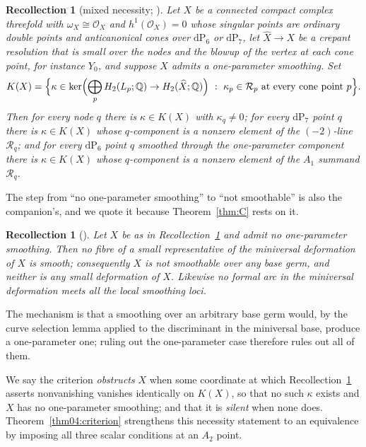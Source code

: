 \documentclass[11pt]{amsart}
\newtheorem{recollection}[theorem]{Recollection}
\theoremstyle{definition}
\theoremstyle{remark}
\theoremstyle{plain}
\newcommand{\QQ}{\mathbb{Q}}
\newcommand{\cO}{\mathcal{O}}
\newcommand{\Rsm}{\mathcal{R}}   %
\newcommand{\dP}{\mathrm{dP}}
\newcommand{\Xh}{\widehat{X}}
\begin{document}
\begin{recollection}[mixed necessity; {\cite[Thm.~6.1]{PaperIV}}]\label{thm:companion}
Let $X$ be a connected compact complex threefold with $\omega_X\cong\cO_X$ and
$h^1(\cO_X)=0$ whose singular points are ordinary double points and
anticanonical cones over $\dP_6$ or $\dP_7$, let $\Xh\to X$ be a crepant
resolution that is small over the nodes and the blowup of the vertex at each
cone point, for instance $Y_0$, and suppose $X$ admits a
one-parameter smoothing.  Set
\[
  K(X)=\Bigl\{\kappa\in\ker\Bigl(\bigoplus_pH_2(L_p;\QQ)\to H_2(\Xh;\QQ)\Bigr)
  \ :\ \kappa_p\in \Rsm_p\text{ at every cone point }p\Bigr\}.
\]
Then for every node $q$ there is $\kappa\in K(X)$ with $\kappa_q\neq0$; for
every $\dP_7$ point $q$ there is $\kappa\in K(X)$ whose $q$-component is a
nonzero element of the $(-2)$-line $\Rsm_q$; and for every $\dP_6$ point $q$
smoothed through the one-parameter component there is $\kappa\in K(X)$ whose
$q$-component is a nonzero element of the $A_1$ summand $\Rsm_q$.
\end{recollection}

The step from ``no one-parameter smoothing'' to ``not smoothable'' is also the
companion's, and we quote it because Theorem~\ref{thm:C} rests on it.

\begin{recollection}[{\cite[Cor.~6.7]{PaperIV}}]\label{thm:noarc}
Let $X$ be as in Recollection~\ref{thm:companion} and admit no one-parameter
smoothing.  Then no fibre of a small representative of the miniversal
deformation of $X$ is smooth; consequently $X$ is not smoothable over any base
germ, and neither is any small deformation of $X$.  Likewise no formal arc in
the miniversal deformation meets all the local smoothing loci.
\end{recollection}

The mechanism is that a smoothing over an arbitrary base germ would, by the
curve selection lemma applied to the discriminant in the miniversal base,
produce a one-parameter one; ruling out the one-parameter case therefore rules
out all of them.

We say the criterion \emph{obstructs} $X$ when some coordinate at which
Recollection~\ref{thm:companion} asserts nonvanishing vanishes identically on
$K(X)$, so that no such $\kappa$ exists and $X$ has no one-parameter smoothing;
and that it is \emph{silent} when none does.  Theorem~\ref{thm04:criterion} strengthens this necessity statement
to an equivalence by imposing all three scalar conditions at an $A_2$ point.
\end{document}
